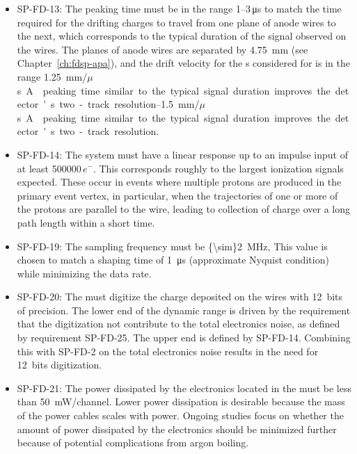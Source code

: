 \begin{itemize}
\item SP-FD-13: The  peaking time must be in the range \numrange{1}{3}\,\si{\micro\second} 
to match the time required for the drifting charges to travel from one plane of anode
wires to the next, which corresponds to the typical duration of the signal observed
on the wires. The planes of anode wires are separated by \SI{4.75}{mm} 
(see Chapter~\ref{ch:fdsp-apa}), and the drift velocity for
the \efield{}s considered for  is in the range
\SIrange{1.25}{1.5}{mm/$\mu$s}. %
A  peaking time  similar to the typical signal duration improves the detector's two-track resolution.  

\item SP-FD-14: The system must have a linear response up to an impulse input of 
at least \num{500000}\,$e^{-}$.  This corresponds roughly to the largest 
ionization signals expected. 
These occur in events where multiple protons are produced 
in the primary event vertex, in particular, when the trajectories of one 
or more of %
the protons are parallel to the wire, %
leading to collection of charge over a long path length within a short time.

\item SP-FD-19:  The  sampling frequency must be \SI{{\sim}2}{MHz},
This value is chosen to match a  shaping time of \SI{1}{\micro\second} 
(approximate Nyquist condition) while minimizing the data rate.

\item SP-FD-20:  The  must digitize the charge deposited on the wires 
with 12~bits of precision.  The lower end of the  dynamic 
range is driven by the requirement that the digitization not contribute 
to the total electronics noise, as defined by requirement SP-FD-25. The upper end
is defined by SP-FD-14. Combining this with SP-FD-2 on the total electronics noise 
results in the need for 12~bits digitization. 


\item SP-FD-21:   The power dissipated by the electronics located in the  must
be less than \SI{50}{mW/channel}. Lower power dissipation is desirable because 
the mass of the power cables scales with  power. 
 Ongoing studies 
focus on whether the amount of power dissipated by the electronics 
should be minimized further 
 because of potential complications from 
argon boiling. %


\end{itemize}
